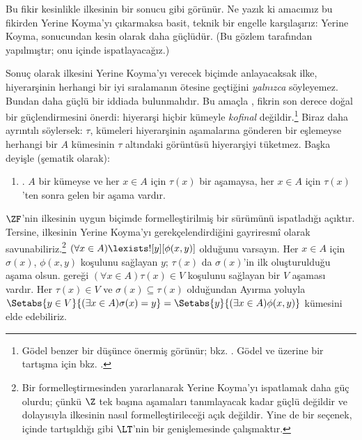 \documentclass[../../../include/open-logic-section]{subfiles}
\begin{document}
Bu fikir kesinlikle \stagesinex{} ilkesinin bir sonucu gibi görünür. Ne yazık
ki amacımız bu fikirden Yerine Koyma'yı çıkarmaksa basit, teknik bir engelle
karşılaşırız: Yerine Koyma,
 sonucundan kesin olarak
daha güçlüdür. (Bu gözlem \citet[\S13.2]{Potter2004} tarafından yapılmıştır;
onu  içinde
ispatlayacağız.)

Sonuç olarak \stagesinex{} ilkesini Yerine Koyma'yı verecek biçimde
anlayacaksak ilke, hiyerarşinin herhangi bir iyi sıralamanın ötesine geçtiğini
\emph{yalnızca} söyleyemez. Bundan daha güçlü bir iddiada bulunmalıdır. Bu
amaçla \cite{Shoenfield:AST}, fikrin son derece doğal bir güçlendirmesini
önerdi: hiyerarşi hiçbir kümeyle \emph{kofinal} değildir.\footnote{G\"odel
benzer bir düşünce önermiş görünür; bkz. \citet[p.~223]{Potter2004}. G\"odel
ve \citeauthor{Shoenfield:AST} üzerine bir tartışma için bkz.
\citet[90--5]{Incurvati2020}.} Biraz daha ayrıntılı söylersek: $\tau$, kümeleri
hiyerarşinin aşamalarına gönderen bir eşlemeyse herhangi bir $A$ kümesinin
$\tau$ altındaki görüntüsü hiyerarşiyi tüketmez. Başka deyişle (şematik
olarak):
\begin{enumerate}
	\item[] \stagescofin. $A$ bir kümeyse ve her $x \in A$ için $\tau(x)$
	bir aşamaysa, her $x \in A$ için $\tau(x)$'ten sonra gelen bir aşama vardır.
\end{enumerate}
$\ZF$'nin \stagescofin{} ilkesinin uygun biçimde formelleştirilmiş bir
sürümünü ispatladığı açıktır. Tersine, \stagescofin{} ilkesinin Yerine
Koyma'yı gerekçelendirdiğini gayriresmî olarak savunabiliriz.\footnote{Bir
\stagescofin{} formelleştirmesinden yararlanarak Yerine Koyma'yı ispatlamak
daha güç olurdu; çünkü $\Z$ tek başına aşamaları tanımlayacak kadar güçlü
değildir ve dolayısıyla \stagescofin{} ilkesinin nasıl formelleştirileceği
açık değildir. Yine de bir seçenek,
 içinde tartışıldığı gibi $\LT$'nin
bir genişlemesinde çalışmaktır.} $(\forall x \in A)\lexists![y][\phi(x,y)]$
olduğunu varsayın. Her $x \in A$ için $\sigma(x)$, $\phi(x,y)$ koşulunu
sağlayan $y$; $\tau(x)$ da $\sigma(x)$'in ilk oluşturulduğu aşama olsun.
\stagescofin{} gereği $(\forall x \in A)\tau(x)\in V$ koşulunu sağlayan bir
$V$ aşaması vardır. Her $\tau(x) \in V$ ve $\sigma(x) \subseteq \tau(x)$
olduğundan Ayırma yoluyla
$\Setabs{y \in V}{(\exists x \in A)\sigma(x) = y} =
\Setabs{y}{(\exists x \in A)\phi(x,y)}$ kümesini elde edebiliriz.
\end{document}
